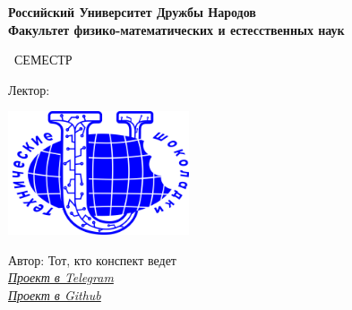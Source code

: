 \begin{titlepage}
	\clearpage\thispagestyle{empty}
	\centering
	
	\textbf{Российский Университет Дружбы Народов \\ Факультет физико-математических и естесственных наук}
	\vspace{33ex}
	
	{\Huge\textbf{\FullCourseNameFirstPart}}
	
	\SemesterNumber\ СЕМЕСТР  
	\vspace{1ex}
	
	Лектор: \textit{\LecturerInitials}

	\vspace{15mm}
	
	\includegraphics[width=0.4\textwidth]{images/logo.png}

	\begin{flushright}
		\noindent
		Автор: Тот, кто конспект ведет
		\\
		\href{\TGLink}{\textit{Проект в Telegram}}
		\\
		\href{\GitLink}{\textit{Проект в Github}}
	\end{flushright}
	
	\vfill
	\CourseDate
	\pagebreak
\end{titlepage}